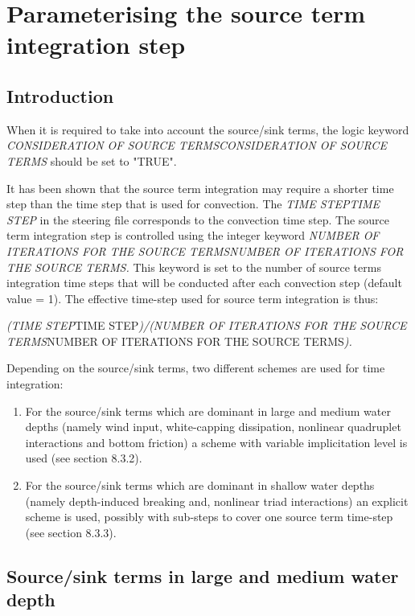 \section{ Parameterising the source term integration step}


\subsection{ Introduction}

 When it is required to take into account the source/sink terms, the logic keyword \textit{CONSIDERATION OF SOURCE TERMSCONSIDERATION OF SOURCE TERMS }should be set to "TRUE".

 It has been shown that the source term integration may require a shorter time step than the time step that is used for convection. The \textit{TIME STEPTIME STEP} in the steering file corresponds to the convection time step. The source term integration step is controlled using the integer keyword \textit{NUMBER OF ITERATIONS FOR THE SOURCE TERMSNUMBER OF ITERATIONS FOR THE SOURCE TERMS.} This keyword is set to the number of source terms integration time steps that will be conducted after each convection step (default value = 1). The effective time-step used for source term integration is thus:

 \textit{(TIME STEP}TIME STEP\textit{)/(NUMBER OF ITERATIONS FOR THE SOURCE TERMS}NUMBER OF ITERATIONS FOR THE SOURCE TERMS\textit{).}

 Depending on the source/sink terms, two different schemes are used for time integration:

\begin{enumerate}
\item  For the source/sink terms which are dominant in large and medium water depths (namely wind input, white-capping dissipation, nonlinear quadruplet interactions and bottom friction) a scheme with variable implicitation level is used (see section 8.3.2).

\item  For the source/sink terms which are dominant in shallow water depths (namely depth-induced breaking and, nonlinear triad interactions) an explicit scheme is used, possibly with sub-steps to cover one source term time-step (see section 8.3.3).
\end{enumerate}


\subsection{ Source/sink terms in large and medium water depth}



